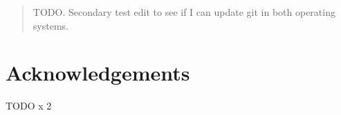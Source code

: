 \documentclass[12pt]{report}
\begin{document}
	\setlength{\parindent}{1.5em}

	\newpage
	
	\doublespacing
	
	\begin{abstract}
		TODO. Secondary test edit to see if I can update git in both operating systems.
	\end{abstract}

	
	\chapter*{Acknowledgements}
	 TODO x 2
	\clearpage
	
	\tableofcontents
	\listoffigures
	\listoftables
	
	\clearpage

	\setcounter{page}{1}
	
    
	
	
	
	
	
	
	
	\singlespacing
	\nocite{*}
	
	
	
\end{document}
